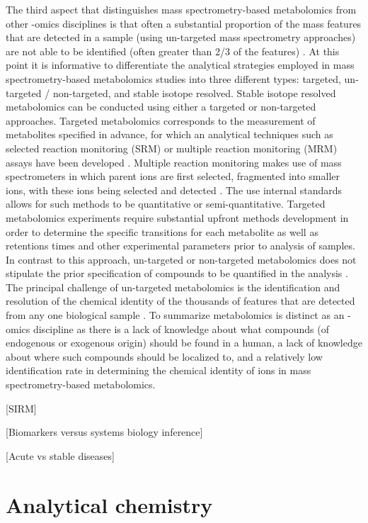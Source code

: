 \begin{DoubleSpace*}
The third aspect that distinguishes mass spectrometry-based metabolomics from other -omics disciplines is that often a substantial proportion of the mass features that are detected in a sample (using un-targeted mass spectrometry approaches) are not able to be identified (often greater than 2/3 of the features) \cite{newgard2017}. At this point it is informative to differentiate the analytical strategies employed in mass spectrometry-based metabolomics studies into three different types: targeted, un-targeted / non-targeted, and stable isotope resolved. Stable isotope resolved metabolomics can be conducted using either a targeted or non-targeted approaches. Targeted metabolomics corresponds to the measurement of metabolites specified in advance, for which an analytical techniques such as selected reaction monitoring (SRM) or multiple reaction monitoring (MRM) assays have been developed \cite{roberts2012,zamboni2015}.  Multiple reaction monitoring makes use of mass spectrometers in which parent ions are first selected, fragmented into smaller ions, with these ions being selected and detected \cite{roberts2012}. The use internal standards allows for such methods to be quantitative or semi-quantitative. Targeted metabolomics experiments require substantial upfront methods development in order to determine the specific transitions for each metabolite as well as retentions times and other experimental parameters prior to analysis of samples. In contrast to this approach, un-targeted or non-targeted metabolomics does not stipulate the prior specification of compounds to be quantified in the analysis \cite{zamboni2015,putri2013,roberts2012}. The principal challenge of un-targeted metabolomics is the identification and resolution of the chemical identity of the thousands of features that are detected from any one biological sample \cite{zamboni2015}. To summarize metabolomics is distinct as an -omics discipline as there is a lack of knowledge about what compounds (of endogenous or exogenous origin) should be found in a human, a lack of knowledge about where such compounds should be localized to, and a relatively low identification rate in determining the chemical identity of ions in mass spectrometry-based metabolomics.

[SIRM] \cite{newgard2017}

[Biomarkers versus systems biology inference] \cite{johnson2016}

[Acute vs stable diseases]

\section{Analytical chemistry}
\end{DoubleSpace*}